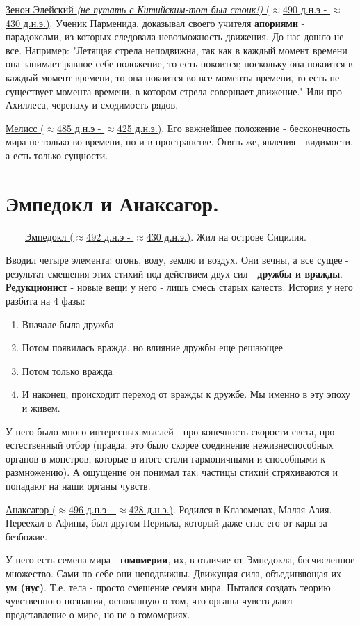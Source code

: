 \documentclass[12pt,a4paper]{article}
\begin{document}
\underline{Зенон Элейский \textit{(не путать с Китийским-тот был стоик!)} ($\approx$490 д.н.э - $\approx$430 д.н.э.)}. Ученик Парменида, доказывал своего учителя \textbf{апориями} - парадоксами, из которых следовала невозможность движения. До нас дошло не все. Например: "Летящая стрела неподвижна, так как в каждый момент времени она занимает равное себе положение, то есть покоится; поскольку она покоится в каждый момент времени, то она покоится во все моменты времени, то есть не существует момента времени, в котором стрела совершает движение." Или про Ахиллеса, черепаху и сходимость рядов.

\underline{Мелисс ($\approx$485 д.н.э - $\approx$425 д.н.э.)}. Его важнейшее положение - бесконечность мира не только во времени, но и в пространстве. Опять же, явления - видимости, а есть только сущности.



\section{Эмпедокл и Анаксагор.}
\ \ \ \
\underline{Эмпедокл ($\approx$492 д.н.э - $\approx$430 д.н.э.)}. Жил на острове Сицилия.

Вводил четыре элемента: огонь, воду, землю и воздух. Они вечны, а все сущее - результат смешения этих стихий под действием двух сил - \textbf{дружбы и вражды}. \textbf{Редукционист} - новые вещи у него - лишь смесь старых качеств. История у него разбита на 4 фазы:
\begin{enumerate}
\item Вначале была дружба
\item Потом появилась вражда, но влияние дружбы еще решающее
\item Потом только вражда
\item И наконец, происходит переход от вражды к дружбе. Мы именно в эту эпоху и живем.
\end{enumerate}
У него было много интересных мыслей - про конечность скорости света, про естественный отбор (правда, это было скорее соединение нежизнеспособных органов в монстров, которые в итоге стали гармоничными и способными к размножению). А ощущение он понимал так: частицы стихий стряхиваются и попадают на наши органы чувств.

\underline{Анаксагор ($\approx$496 д.н.э - $\approx$428 д.н.э.)}. Родился в Клазоменах, Малая Азия. Переехал в Афины, был другом Перикла, который даже спас его от кары за безбожие.

У него есть семена мира - \textbf{гомомерии}, их, в отличие от Эмпедокла, бесчисленное множество. Сами по себе они неподвижны. Движущая сила, объединяющая их - \textbf{ум (нус)}. Т.е. тела - просто смешение семян мира. Пытался создать теорию чувственного познания, основанную о том, что органы чувств дают представление о мире, но не о гомомериях. 
\end{document}
